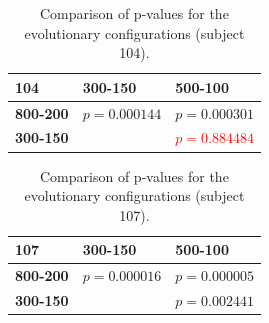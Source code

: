     \vspace{0.3cm}

    \begin{table}[h]

        \centering
        \setlength\arrayrulewidth{0.8pt}

        \begin{tabular}{| >{\centering\arraybackslash}m{0.9in} | >{\centering\arraybackslash}m{0.9in} | >{\centering\arraybackslash}m{0.9in} |}

            \hline
            \rowcolor{RoyalBlue}
            \textbf{104} & \textbf{300-150} & \textbf{500-100} \\
            \hline
            \cellcolor{RoyalBlue}\textbf{800-200} & $p = 0.000144$ & $p = 0.000301$ \\
            \hline
            \cellcolor{RoyalBlue}\textbf{300-150} & \cellcolor{lightgray} & \textcolor{red}{$p = 0.884484$} \\
            \hline

        \end{tabular}

        \caption{Comparison of p-values for the evolutionary configurations (subject 104).}\label{table:popgen_kruskal_104}

    \end{table}

    \begin{table}[h]

        \centering
        \setlength\arrayrulewidth{0.8pt}

        \begin{tabular}{| >{\centering\arraybackslash}m{0.9in} | >{\centering\arraybackslash}m{0.9in} | >{\centering\arraybackslash}m{0.9in} |}

        	\hline
            \rowcolor{RoyalBlue}
            \textbf{107} & \textbf{300-150} & \textbf{500-100} \\
            \hline
            \cellcolor{RoyalBlue}\textbf{800-200} & $p = 0.000016$ & $p = 0.000005$ \\
            \hline
            \cellcolor{RoyalBlue}\textbf{300-150} & \cellcolor{lightgray} & $p = 0.002441$ \\
            \hline

        \end{tabular}

        \caption{Comparison of p-values for the evolutionary configurations (subject 107).}\label{table:popgen_kruskal_107}

    \end{table}

